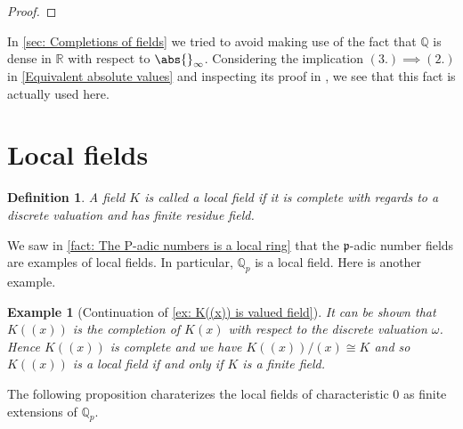 \documentclass{article}
\newtheorem{definition}{Definition}[section]
\newtheorem{example}{Example}[section]
\newcommand{\mfrak}[1]{\mathfrak{#1}}
\newcommand{\mbb}[1]{\mathbb{#1}}
\numberwithin{equation}{section}
\begin{document}
\begin{proof}

\end{proof}
In \cref{sec: Completions of fields} we tried to avoid making use of the fact that $\mbb Q$ is dense in $\mbb R$ with respect to $\abs{}_\infty$. Considering the implication $(3.) \implies (2.)$ in \cref{Equivalent absolute values} and inspecting its proof in \citep[Proposition 3.3]{neukirch}, we see that this fact is actually used here.

\section{Local fields}

\begin{definition}\label{def: Local field}
	A field $K$ is called a local field if it is complete with regards to a discrete valuation and has finite residue field.
\end{definition}

We saw in \cref{fact: The P-adic numbers is a local ring} that the $\mfrak p$-adic number fields are examples of local fields. In particular, $\mbb Q_p$ is a local field. Here is another example.
\begin{example}[Continuation of \cref{ex: K((x)) is valued field}]\label{K((x)) is local if K finite}
	It can be shown that $K((x))$ is the completion of $K(x)$ with respect to the discrete valuation $\omega$. Hence $K((x))$ is complete and we have $K((x)) / (x) \cong K$ and so $K((x))$ is a local field if and only if $K$ is a finite field.
\end{example}

The following proposition charaterizes the local fields of characteristic 0 as finite extensions of $\mbb Q_p$.
\end{document}
